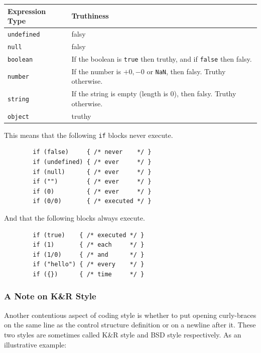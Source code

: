 \documentclass[11pt,letter]{book}
\begin{document}
    \vspace{10pt}
    \begin{tabular}{l|l}
        Expression Type     & Truthiness \\ \hline
        \texttt{undefined}  & falsy \\
        \texttt{null}       & falsy \\
        \texttt{boolean}    & If the boolean is \texttt{true} then truthy, and if \texttt{false} 
            then falsy. \\
        \texttt{number}     & If the number is $+0, -0$ or \texttt{NaN}, then falsy. Truthy 
            otherwise. \\
        \texttt{string}     & If the string is empty (length is 0), then falsy. Truthy otherwise. \\
        \texttt{object}     & truthy \\
    \end{tabular}
    \vspace{10pt}
    
    This means that the following \texttt{if} blocks never execute.
    
    \begin{verbatim}
        if (false)     { /* never    */ }
        if (undefined) { /* ever     */ }
        if (null)      { /* ever     */ }
        if ("")        { /* ever     */ }
        if (0)         { /* ever     */ }
        if (0/0)       { /* executed */ }
    \end{verbatim}
    
    And that the following blocks always execute.
    
    \begin{verbatim}
        if (true)    { /* executed */ }
        if (1)       { /* each     */ }
        if (1/0)     { /* and      */ }
        if ("hello") { /* every    */ }
        if ({})      { /* time     */ }
    \end{verbatim}
    
    \subsubsection{A Note on K\&R Style}
    Another contentious aspect of coding style is whether to put opening curly-braces on the same 
    line as the control structure definition or on a newline after it. These two styles are 
    sometimes called K\&R style and BSD style respectively. As an illustrative example:
    
\end{document}
